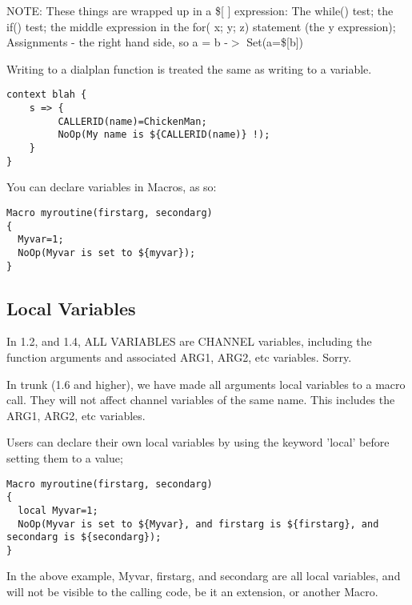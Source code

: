 {NOTE: These things are wrapped up in a \$[ ] expression: The while() test;
the if() test; the middle expression in the for( x; y; z) statement
(the y expression); Assignments - the right hand side, so a = b -$>$ Set(a=\$[b])

Writing to a dialplan function is treated the same as writing to a variable.

\begin{astlisting}
\begin{verbatim}
context blah {
    s => {
         CALLERID(name)=ChickenMan;
         NoOp(My name is ${CALLERID(name)} !);
    }
}
\end{verbatim}
\end{astlisting}

You can declare variables in Macros, as so:

\begin{astlisting}
\begin{verbatim}
Macro myroutine(firstarg, secondarg)
{
  Myvar=1;
  NoOp(Myvar is set to ${myvar});
}
\end{verbatim}
\end{astlisting}

\subsection{Local Variables}

In 1.2, and 1.4, ALL VARIABLES are CHANNEL variables, including the function
arguments and associated ARG1, ARG2, etc variables. Sorry.

In trunk (1.6 and higher), we have made all arguments local variables to
a macro call. They will not affect channel variables of the same name.
This includes the ARG1, ARG2, etc variables.

Users can declare their own local variables by using the keyword 'local'
before setting them to a value;

\begin{astlisting}
\begin{verbatim}
Macro myroutine(firstarg, secondarg)
{
  local Myvar=1;
  NoOp(Myvar is set to ${Myvar}, and firstarg is ${firstarg}, and secondarg is ${secondarg});
}
\end{verbatim}
\end{astlisting}

In the above example, Myvar, firstarg, and secondarg are all local variables,
and will not be visible to the calling code, be it an extension, or another Macro.

}
